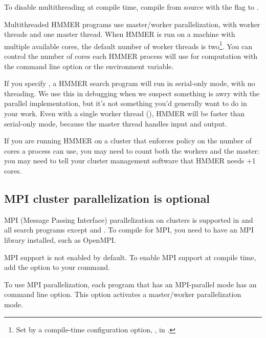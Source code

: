 To disable multithreading at compile time, compile from source with
the  flag to .

Multithreaded HMMER programs use master/worker parallelization, with
 worker threads and one master thread. When HMMER is run on
a machine with multiple available cores, the default number of worker
threads is two\footnote{Set by a compile-time configuration option,
  , in .}. You can control the
number of cores each HMMER process will use for computation with the
 command line option or the 
environment variable.

If you specify , a HMMER search program will run in
serial-only mode, with no threading. We use this in debugging when we
suspect something is awry with the parallel implementation, but it's
not something you'd generally want to do in your work.  Even with a
single worker thread (), HMMER will be faster than
serial-only mode, because the master thread handles input and output.

If you are running HMMER on a cluster that enforces policy on the
number of cores a process can use, you may need to count both the
workers and the master: you may need to tell your cluster management
software that HMMER needs +1 cores.


\subsection{MPI cluster parallelization is optional}

MPI (Message Passing Interface) parallelization on clusters is
supported in  and all search programs except  and
. To compile for MPI, you need to have an MPI library
installed, such as OpenMPI.

MPI support is not enabled by default.  To enable MPI support at
compile time, add the  option to your
 command.

To use MPI parallelization, each program that has an MPI-parallel mode
has an  command line option. This option activates a
master/worker parallelization mode.

